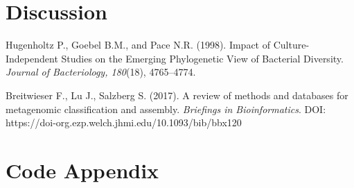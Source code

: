 \documentclass{article}
\begin{document}
\section{Discussion}

\begin{thebibliography}{99}
Hugenholtz P., Goebel B.M., and Pace N.R. (1998). Impact of Culture-Independent Studies on the Emerging Phylogenetic View of Bacterial Diversity. \textit{Journal of Bacteriology, 180}(18), 4765–4774. 

Breitwieser F., Lu J., Salzberg S. (2017). A review of methods and databases for metagenomic classification and assembly. \textit{Briefings in Bioinformatics}. DOI: https://doi-org.ezp.welch.jhmi.edu/10.1093/bib/bbx120

\end{thebibliography}

\smallbreak
\appendix
\section{Code Appendix}
\end{document}
